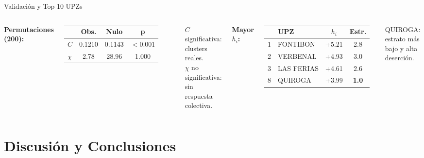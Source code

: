 \documentclass[11pt]{beamer}
\begin{document}
\begin{frame}{Validación y Top 10 UPZs}

\begin{columns}[T]
\textbf{Permutaciones (200):}
\begin{table}[h]
\centering
\scriptsize
\begin{tabular}{l c c c}
\toprule
 & \textbf{Obs.} & \textbf{Nulo} & \textbf{p} \\
\midrule
$C$ & 0.1210 & 0.1143 & \alert{$<0.001$} \\
$\chi$ & 2.78 & 28.96 & 1.000 \\
\bottomrule
\end{tabular}
\end{table}
\small
$C$ significativa: clusters reales.\\
$\chi$ no significativa: sin respuesta colectiva.

\textbf{Mayor $h_i$:}
\begin{table}[h]
\centering
\scriptsize
\begin{tabular}{r l c c}
\toprule
 & \textbf{UPZ} & \textbf{$h_i$} & \textbf{Estr.} \\
\midrule
1 & FONTIBON & +5.21 & 2.8 \\
2 & VERBENAL & +4.93 & 3.0 \\
3 & LAS FERIAS & +4.61 & 2.6 \\
8 & QUIROGA & +3.99 & \textbf{1.0} \\
\bottomrule
\end{tabular}
\end{table}
\vspace{-0.2cm}
\scriptsize QUIROGA: estrato más bajo y alta deserción.
\end{columns}
\end{frame}

\section{Discusión y Conclusiones}
\end{document}
